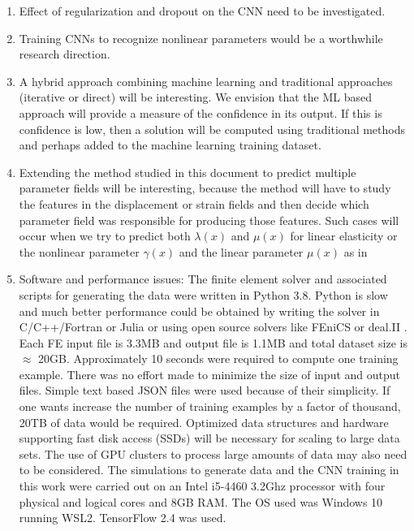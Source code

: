 \documentclass[12pt]{article}
\begin{document}
\begin{enumerate}
\item{Effect of regularization and dropout on the CNN need to be investigated.}
\item{Training CNNs to recognize nonlinear parameters would be a worthwhile research direction.}
\item{A hybrid approach combining machine learning and traditional approaches (iterative or direct) will be interesting. We envision that the ML based approach will provide a measure of the confidence in its output. If this is confidence is low, then a solution will be computed using traditional methods and perhaps added to the machine learning training dataset.}
\item{Extending the method studied in this document to predict multiple parameter fields will be interesting, because the method will have to study the features in the displacement or strain fields and then decide which parameter field was responsible for producing those features. Such cases will occur when we try to predict both $\lambda(x)$ and $\mu(x)$ for linear elasticity or the nonlinear parameter $\gamma(x)$ and the linear parameter $\mu(x)$ as in \cite{paper:gokhale2008}}
\item{Software and performance issues: The finite element solver and associated scripts for generating the data were written in Python 3.8. Python is slow and much better performance could be obtained by writing the solver in C/C++/Fortran or Julia or using open source solvers like FEniCS \cite{paper:fenics} or deal.II \cite{misc:deal.ii}. Each FE input file is 3.3MB and output file is 1.1MB and total dataset size is $\approx$  20GB. Approximately 10 seconds were required to compute one training example. There was no effort made to minimize the size of input and output files. Simple text based JSON files were used because of their simplicity. If one wants increase the number of training examples by a factor of thousand, 20TB of data would be required. Optimized data structures and hardware supporting fast disk access (SSDs) will be necessary for scaling to large data sets. The use of GPU clusters to process large amounts of data may also need to be considered. The simulations to generate data and the CNN training in this work were carried out on an Intel i5-4460 3.2Ghz processor with four physical and logical cores and 8GB RAM. The OS used was Windows 10 running WSL2. TensorFlow 2.4 was used.}
\end{enumerate}
\clearpage
{}

\end{document}
